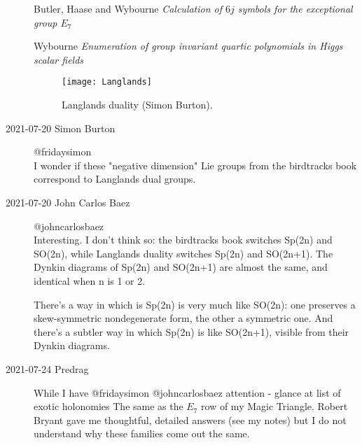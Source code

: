 \begin{description}
Butler, Haase and Wybourne
{\em Calculation of {$6j$} symbols for the exceptional group {$E_7$}}

Wybourne
{\em Enumeration of group invariant quartic polynomials in {Higgs} scalar fields}

\begin{figure}%
  \begin{center}
\texttt{[image: Langlands]}
  \end{center}
\caption{
Langlands duality (Simon Burton).
}
\label{fig:Langlands}
\end{figure}


\item[2021-07-20 Simon Burton]
{@fridaysimon}
\\
I wonder if these
{"negative dimension" Lie groups} from the {birdtracks book} correspond
to Langlands dual groups.

\item[2021-07-20 John Carlos Baez]
{@johncarlosbaez}
\\
Interesting.  I don't think so: the birdtracks book switches Sp(2n) and
SO(2n), while Langlands duality switches Sp(2n) and SO(2n+1).   The
Dynkin diagrams of Sp(2n) and SO(2n+1) are almost the same, and identical
when n is 1 or 2.

There's a way in which is Sp(2n) is very much like SO(2n): one preserves
a skew-symmetric nondegenerate form, the other a symmetric one.  And
there's a subtler way in which Sp(2n) is like SO(2n+1), visible from
their Dynkin diagrams.

\item[2021-07-24 Predrag]
While I have @fridaysimon @johncarlosbaez attention - glance at
 list of
 {exotic
holonomies} The same as the $E_7$ row of my Magic Triangle. Robert Bryant
gave me thoughtful, detailed answers (see
 {my notes}) but I
do not understand why these families come out the same.








\end{description}
\renewcommand{\ssp}{a}


\printbibliography[heading=subbibintoc,title={References}]
